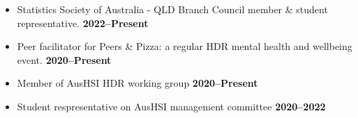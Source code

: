 \begin{itemize}
	\item Statistics Society of Australia - QLD Branch Council member \& student representative. \hfill\textbf{2022--Present}
	\item Peer facilitator for Peers \& Pizza: a regular HDR mental health and wellbeing event. \hfill\textbf{2020--Present}
	\item Member of AusHSI HDR working group \hfill\textbf{2020--Present}
	\item Student respresentative on AusHSI management committee \hfill\textbf{2020--2022}
\end{itemize}\par